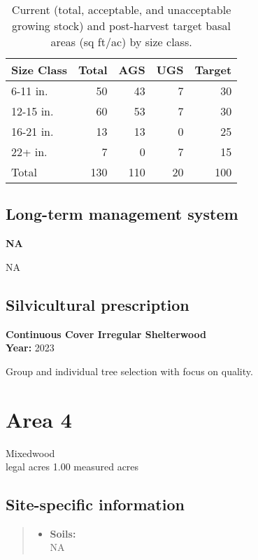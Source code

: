 \documentclass[]{tufte-handout}
\providecommand{\tightlist}{%
  \setlength{\itemsep}{0pt}\setlength{\parskip}{0pt}}
\begin{document}
\begin{table}

\caption{\label{tab:unnamed-chunk-19}Current (total, acceptable, and unacceptable growing stock) and post-harvest target basal areas (sq ft/ac) by size class.}
\centering
\begin{tabular}[t]{lrrrr}
\toprule
Size Class & Total & AGS & UGS & Target\\
\midrule
6-11 in. & 50 & 43 & 7 & 30\\
12-15 in. & 60 & 53 & 7 & 30\\
16-21 in. & 13 & 13 & 0 & 25\\
22+ in. & 7 & 0 & 7 & 15\\
Total & 130 & 110 & 20 & 100\\
\bottomrule
\end{tabular}
\end{table}

\subsection{Long-term management
system}\label{long-term-management-system-2}

\textbf{NA}

NA

\subsection{Silvicultural
prescription}\label{silvicultural-prescription-2}

\textbf{Continuous Cover Irregular Shelterwood}\\
\noindent \textbf{Year:} 2023

Group and individual tree selection with focus on quality.

\newpage

\section{Area 4}\label{area-4}

Mixedwood\\
 legal acres \textbar{} 1.00 measured acres

\subsection{Site-specific
information}\label{site-specific-information-3}

\begin{quote}
\begin{itemize}
\tightlist
\item
  \textbf{Soils:}\\
  \indent\indent  NA
\end{itemize}
\end{quote}
\end{document}
